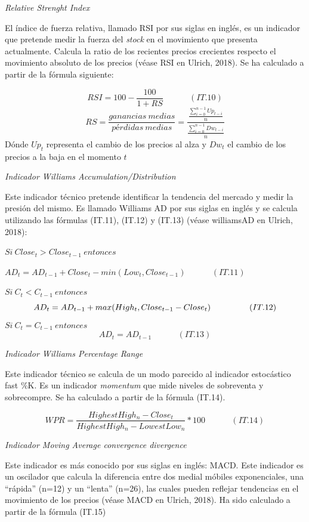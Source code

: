 \documentclass[]{DissertateUSU}
\begin{document}
\emph{Relative Strenght Index}

\noindent El índice de fuerza relativa, llamado RSI por sus siglas en
inglés, es un indicador que pretende medir la fuerza del \emph{stock} en
el movimiento que presenta actualmente. Calcula la ratio de los
recientes precios crecientes respecto el movimiento absoluto de los
precios (véase RSI en Ulrich, 2018). Se ha calculado a partir de la
fórmula siguiente:

\[RSI=100 - \frac{100}{1+RS} \ \ \ \ \ \ \ \ \ \ \ \ \ \ (IT.10)\]
\[RS=\frac{ganancias \ medias}{pérdidas \ medias}=\frac{\frac{\sum_{i=0}^{n-1}Up_{t-i}}{n}}{\frac{\sum_{i=0}^{n-1}Dw_{t-i}}{n}}\]
\noindent Dónde \(Up_t\) representa el cambio de los precios al alza y
\(Dw_t\) el cambio de los precios a la baja en el momento \(t\)

\emph{Indicador Williams Accumulation/Distribution}

\noindent Este indicador técnico pretende identificar la tendencia del
mercado y medir la presión del mismo. Es llamado Williams AD por sus
siglas en inglés y se calcula utilizando las fórmulas (IT.11), (IT.12) y
(IT.13) (véase williamsAD en Ulrich, 2018):

\noindent \(Si \ Close_t > Close_{t-1}\ entonces\)

\(AD_t = AD_{t-1}+Close_t- min(Low_t, Close_{t-1}) \ \ \ \ \ \ \ \ \ \ \ \ \ \ (IT.11)\)

\noindent \(Si \  C_t < C_{t-1} \ entonces\)
\[AD_t = AD_{t-1} + max(High_t, Close_{t-1}\\-Close_t) \ \ \ \ \ \ \ \ \ \ \ \ \ \ (IT.12)\]
\(Si \  C_t = C_{t-1} \ entonces\)
\[AD_t = AD_{t-1} \ \ \ \ \ \ \ \ \ \ \ \ \ \ (IT.13)\]

\emph{Indicador Williams Percentage Range}

\noindent Este indicador técnico se calcula de un modo parecido al
indicador estocástico fast \%K. Es un indicador \emph{momentum} que mide
niveles de sobreventa y sobrecompre. Se ha calculado a partir de la
fórmula (IT.14).

\[WPR = \frac{HighestHigh_n - Close_t}{HighestHigh_{n}-LowestLow_{n}}*100 \ \ \ \ \ \ \ \ \ \ \ \ \ \ (IT.14)\]

\emph{Indicador Moving Average convergence divergence}

\noindent Este indicador es más conocido por sus siglas en inglés: MACD.
Este indicador es un oscilador que calcula la diferencia entre dos
medial móbiles exponenciales, una ``rápida'' (n=12) y un ``lenta''
(n=26), las cuales pueden reflejar tendencias en el movimiento de los
precios (véase MACD en Ulrich, 2018). Ha sido calculado a partir de la
fórmula (IT.15)
\end{document}
